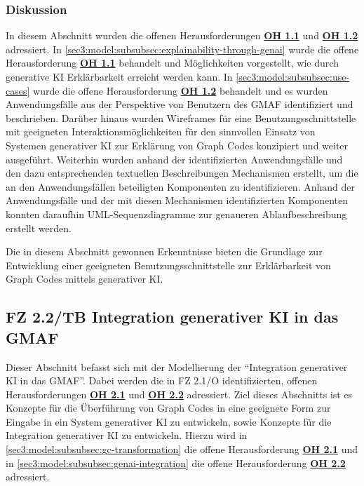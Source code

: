 \FloatBarrier

\subsubsection{Diskussion}
\label{sec3:model:subsubsec:fz1:discussion}
In diesem Abschnitt wurden die offenen Herausforderungen \hyperref[sec2:sota:oi:1.1]{\textbf{OH 1.1}} und \hyperref[sec2:sota:oi:1.1]{\textbf{OH 1.2}} adressiert.
In \cref{sec3:model:subsubsec:explainability-through-genai} wurde die offene Herausforderung \hyperref[sec2:sota:oi:1.1]{\textbf{OH 1.1}} behandelt und Möglichkeiten vorgestellt, wie durch generative KI Erklärbarkeit erreicht werden kann.
In \cref{sec3:model:subsubsec:use-cases} wurde die offene Herausforderung \hyperref[sec2:sota:oi:1.2]{\textbf{OH 1.2}} behandelt und es wurden Anwendungsfälle aus der Perspektive von Benutzern des GMAF identifiziert und beschrieben.
Darüber hinaus wurden Wireframes für eine Benutzungsschnittstelle mit geeigneten Interaktionsmöglichkeiten für den sinnvollen Einsatz von Systemen generativer KI zur Erklärung von Graph Codes konzipiert und weiter ausgeführt.
Weiterhin wurden anhand der identifizierten Anwendungsfälle und den dazu entsprechenden textuellen Beschreibungen Mechanismen erstellt, um die an den Anwendungsfällen beteiligten Komponenten zu identifizieren.
Anhand der Anwendungsfälle und der mit diesen Mechanismen identifizierten Komponenten konnten daraufhin UML-Sequenzdiagramme zur genaueren Ablaufbeschreibung erstellt werden.

Die in diesem Abschnitt gewonnen Erkenntnisse bieten die Grundlage zur Entwicklung einer geeigneten Benutzungsschnittstelle zur Erklärbarkeit von Graph Codes mittels generativer KI.

\clearpage

\subsection{FZ 2.2/TB Integration generativer KI in das GMAF}
\label{sec3:model:subsec:fz-integration}
Dieser Abschnitt befasst sich mit der Modellierung der \enquote{Integration generativer KI in das GMAF}. Dabei werden die in FZ 2.1/O identifizierten, offenen Herausforderungen \hyperref[sec2:sota:oi:2.1]{\textbf{OH 2.1}} und \hyperref[sec2:sota:oi:2.2]{\textbf{OH 2.2}} adressiert.
Ziel dieses Abschnitts ist es Konzepte für die Überführung von Graph Codes in eine geeignete Form zur Eingabe in ein System generativer KI zu entwickeln, sowie Konzepte für die Integration generativer KI zu entwickeln.
Hierzu wird in \cref{sec3:model:subsubsec:gc-transformation} die offene Herausforderung \hyperref[sec2:sota:oi:2.1]{\textbf{OH 2.1}} und in \cref{sec3:model:subsubsec:genai-integration} die offene Herausforderung \hyperref[sec2:sota:oi:2.2]{\textbf{OH 2.2}} adressiert.

